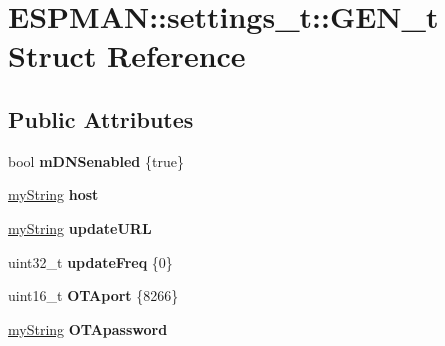 \hypertarget{struct_e_s_p_m_a_n_1_1settings__t_1_1_g_e_n__t}{}\section{E\+S\+P\+M\+AN\+:\+:settings\+\_\+t\+:\+:G\+E\+N\+\_\+t Struct Reference}
\label{struct_e_s_p_m_a_n_1_1settings__t_1_1_g_e_n__t}
\subsection*{Public Attributes}
\begin{DoxyCompactItemize}
\item 
\mbox{\label{struct_e_s_p_m_a_n_1_1settings__t_1_1_g_e_n__t_aeec835601bc1c5f41299a036103091d8}} 
bool {\bfseries m\+D\+N\+Senabled} \{true\}
\item 
\mbox{\label{struct_e_s_p_m_a_n_1_1settings__t_1_1_g_e_n__t_a8c99c150e6c95af13ef32ddd82d0627a}} 
\hyperlink{class_e_s_p_m_a_n_1_1my_string}{my\+String} {\bfseries host}
\item 
\mbox{\label{struct_e_s_p_m_a_n_1_1settings__t_1_1_g_e_n__t_afaae059fdaaf04fe663a9349d0c50b8a}} 
\hyperlink{class_e_s_p_m_a_n_1_1my_string}{my\+String} {\bfseries update\+U\+RL}
\item 
\mbox{\label{struct_e_s_p_m_a_n_1_1settings__t_1_1_g_e_n__t_a8324d39f9e52d23fd528629639d24ffe}} 
uint32\+\_\+t {\bfseries update\+Freq} \{0\}
\item 
\mbox{\label{struct_e_s_p_m_a_n_1_1settings__t_1_1_g_e_n__t_a53523c29696b804a282f1da29eadcb48}} 
uint16\+\_\+t {\bfseries O\+T\+Aport} \{8266\}
\item 
\mbox{\label{struct_e_s_p_m_a_n_1_1settings__t_1_1_g_e_n__t_a949188893480968881fb17c1b506d5c8}} 
\hyperlink{class_e_s_p_m_a_n_1_1my_string}{my\+String} {\bfseries O\+T\+Apassword}
\item 
\mbox{\label{struct_e_s_p_m_a_n_1_1settings__t_1_1_g_e_n__t_ae43e6322470d417489127577b03b3781}} 

\end{DoxyCompactItemize}
